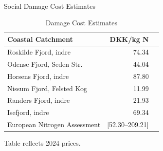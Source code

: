 \documentclass[t,24pt,aspectratio=169]{beamer}
\begin{document}
\begin{frame}{\vspace{-3ex} Social Damage Cost Estimates}

\vspace{-2ex}
\begin{table}[htbp]
\centering
\small
\caption{Damage Cost Estimates}
\label{tab:damage-costs}
\begin{threeparttable}
\begin{tabular}{lrr}
\toprule
Coastal Catchment & DKK/kg N \\
\midrule
Roskilde Fjord, indre   & 74.34  \\
Odense Fjord, Seden Str.& 44.04  \\
Horsens Fjord, indre    & 87.80  \\
Nissum Fjord, Felsted Kog& 11.99  \\
Randers Fjord, indre    & 21.93  \\
Isefjord, indre         & 69.34  \\
\midrule
European Nitrogen Assessment           & [52.30--209.21] \\
\bottomrule
\end{tabular}
\begin{tablenotes}
\footnotesize
\small
\item 
Table reflects 2024 prices.
\end{tablenotes}
\end{threeparttable}
\end{table}

\end{frame}







    
    
    
\end{document}
